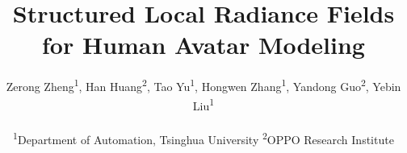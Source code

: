 \documentclass[10pt,twocolumn,letterpaper]{article}
\begin{document}
\title{\Large Structured Local Radiance Fields for Human Avatar Modeling}

\author{
	Zerong Zheng\textsuperscript{1},
	Han Huang\textsuperscript{2},
	Tao Yu\textsuperscript{1},
	Hongwen Zhang\textsuperscript{1},
	Yandong Guo\textsuperscript{2},
	Yebin Liu\textsuperscript{1}
	\\ \\
	\textsuperscript{1}Department of Automation, Tsinghua University
	\quad
	\textsuperscript{2}OPPO Research Institute 
}

\maketitle

\begin{abstract}




\end{abstract}
\end{document}
